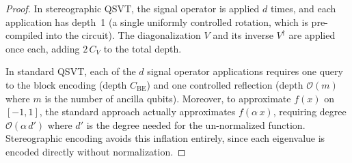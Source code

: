 \begin{proof}
	In stereographic QSVT, the signal operator is applied
	$d$ times, and each application has depth~1 (a single
	uniformly controlled rotation, which is pre-compiled
	into the circuit).  The diagonalization $V$ and its
	inverse $V^\dagger$ are applied once each, adding
	$2\,C_V$ to the total depth.

	In standard QSVT, each of the $d$ signal operator
	applications requires one query to the block encoding
	(depth $C_{\mathrm{BE}}$) and one controlled reflection
	(depth $\mathcal{O}(m)$ where $m$ is the number of
	ancilla qubits).  Moreover, to approximate $f(x)$ on
	$[-1, 1]$, the standard approach actually approximates
	$f(\alpha\,x)$, requiring degree $\mathcal{O}(\alpha\,d')$
	where $d'$ is the degree needed for the un-normalized
	function.  Stereographic encoding avoids this inflation
	entirely, since each eigenvalue is encoded directly
	without normalization.
\end{proof}
